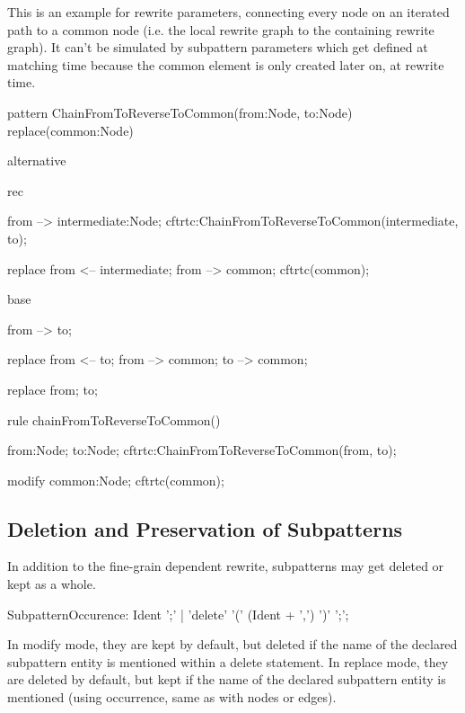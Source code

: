 \begin{example}
This is an example for rewrite parameters, connecting every node on an iterated path to a common node (i.e. the local rewrite graph to the containing rewrite graph).
It can't be simulated by subpattern parameters which get defined at matching time because the common element is only created later on, at rewrite time.

  \begin{grgen}
pattern ChainFromToReverseToCommon(from:Node, to:Node) replace(common:Node)
{
  alternative {
    rec {
      from --> intermediate:Node;
      cftrtc:ChainFromToReverseToCommon(intermediate, to);

      replace {
        from <-- intermediate;
        from --> common;
        cftrtc(common);
      }
    }
    base {
      from --> to;

      replace {
        from <-- to;
        from --> common;
        to --> common;
      }
    }
  }

  replace {
    from; to;
  }
}
  \end{grgen}

  \begin{grgen}  
rule chainFromToReverseToCommon()
{
  from:Node; to:Node;
  cftrtc:ChainFromToReverseToCommon(from, to);

  modify {
    common:Node;
    cftrtc(common);
  }
}
  \end{grgen}
\end{example}

\subsection{Deletion and Preservation of Subpatterns}\label{sub:delpressub}

In addition to the fine-grain dependent rewrite, subpatterns may get deleted or kept as a whole.

\begin{rail}  
  SubpatternOccurence: 
    Ident ';' |
    'delete' '(' (Ident + ',') ')' ';';
\end{rail}

In modify mode, they are kept by default, but deleted if the name of the declared subpattern entity is mentioned within a delete statement.
In replace mode, they are deleted by default, but kept if the name of the declared subpattern entity is mentioned (using occurrence, same as with nodes or edges).

